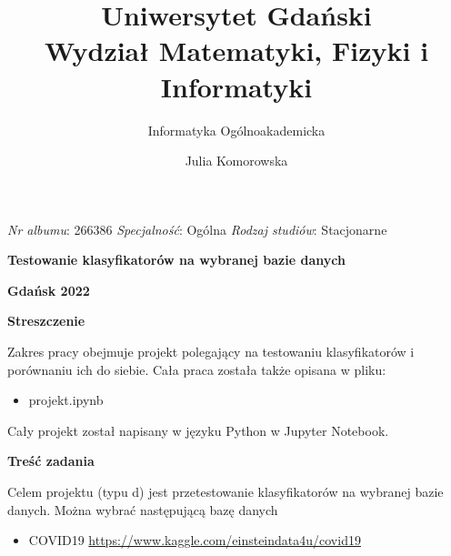\documentclass{article}
\title{\textbf{Uniwersytet Gdański
\\{\Large Wydział Matematyki, Fizyki i Informatyki}}}
\subtitle{Informatyka Ogólnoakademicka}
\author{Julia Komorowska}
\date{}
\begin{document}
\maketitle
\noindent 
\textit{Nr albumu}: 266386\newline\newline
\textit{Specjalność}: Ogólna \newline\newline
\textit{Rodzaj studiów}: Stacjonarne
\newline\newline
\normalsize
\newline\newline\newline\newline
\begin{center}
    {\LARGE\textbf{Testowanie klasyfikatorów na wybranej bazie danych}}\newline\newline
\end{center}


\begin{center}
\textbf{Gdańsk 2022}
\end{center}
\newpage
\begin{flushleft}
{\LARGE\textbf{Streszczenie}}
\end{flushleft}
{\large Zakres pracy obejmuje projekt polegający na testowaniu klasyfikatorów i porównaniu ich do siebie. Cała praca została także opisana w pliku:
\begin{itemize}
\item projekt.ipynb
\end{itemize}
Cały projekt został napisany w języku Python w Jupyter Notebook.}
\newline\newline\newline\newline
{\LARGE\textbf{Treść zadania}}
\newline\newline
{\large Celem projektu (typu d) jest przetestowanie klasyfikatorów na wybranej bazie danych. Można wybrać następującą bazę danych
\begin{itemize}
\item COVID19 \url{https://www.kaggle.com/einsteindata4u/covid19}
\end{itemize} 
}
\newpage
\normalsize
\newline
\tableofcontents
\normalsize
\newline\newline\newline\newline\newline\newline\newline\newline\newpage
\end{document}

